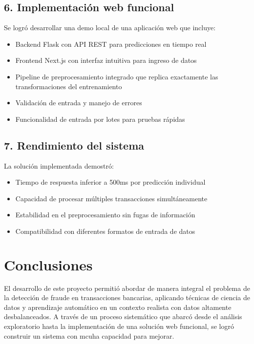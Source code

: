 \documentclass{llncs}
\begin{document}
\subsection{6. Implementación web funcional}

Se logró desarrollar una demo local de una aplicación web que incluye:
\begin{itemize}
    \item Backend Flask con API REST para predicciones en tiempo real
    \item Frontend Next.js con interfaz intuitiva para ingreso de datos
    \item Pipeline de preprocesamiento integrado que replica exactamente las transformaciones del entrenamiento
    \item Validación de entrada y manejo de errores
    \item Funcionalidad de entrada por lotes para pruebas rápidas
\end{itemize}

\subsection{7. Rendimiento del sistema}

La solución implementada demostró:
\begin{itemize}
    \item Tiempo de respuesta inferior a 500ms por predicción individual
    \item Capacidad de procesar múltiples transacciones simultáneamente
    \item Estabilidad en el preprocesamiento sin fugas de información
    \item Compatibilidad con diferentes formatos de entrada de datos
\end{itemize}


\section{Conclusiones}

El desarrollo de este proyecto permitió abordar de manera integral el problema de la detección de fraude en transacciones bancarias, aplicando técnicas de ciencia de datos y aprendizaje automático en un contexto realista con datos altamente desbalanceados. A través de un proceso sistemático que abarcó desde el análisis exploratorio hasta la implementación de una solución web funcional, se logró construir un sistema con mcuha capacidad para mejorar.
\end{document}
